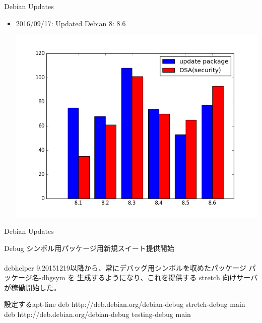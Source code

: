 \begin{frame}{Debian Updates}

\begin{itemize}[<+->]
\item 2016/09/17: Updated Debian 8: 8.6
 \begin{center}
 \includegraphics[width=0.6\hsize]{image201611/stable-updates.png}
 \end{center}

\end{itemize}
\end{frame}

\begin{frame}{Debian Updates}

Debug シンボル用パッケージ用新規スイート提供開始 \\ 
\ \\
debhelper 9.20151219以降から、常にデバッグ用シンボルを収めたパッケージ パッケージ名-dbgsym を
生成するようになり、これを提供する stretch 向けサーバが稼働開始した。

\begin{block}{設定するapt-line}
deb http://deb.debian.org/debian-debug stretch-debug main
deb http://deb.debian.org/debian-debug testing-debug main
\end{block}

\end{frame}

